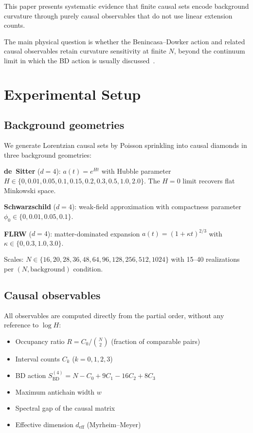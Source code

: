 \documentclass[12pt,a4paper]{article}
\newcommand{\SBD}{S_{\mathrm{BD}}}
\begin{document}
This paper presents systematic evidence that finite causal sets encode
background curvature through purely causal observables that do not use linear
extension counts.

The main physical question is whether the Benincasa--Dowker action and related
causal observables retain curvature sensitivity at finite $N$, beyond the
continuum limit in which the BD action is usually discussed~\cite{BenincasaDowker2010,Surya2019}.

\section{Experimental Setup}

\subsection{Background geometries}

We generate Lorentzian causal sets by Poisson sprinkling into causal diamonds
in three background geometries:

\textbf{de~Sitter} ($d=4$): $a(t) = e^{Ht}$ with Hubble parameter
$H\in\{0, 0.01, 0.05, 0.1, 0.15, 0.2, 0.3, 0.5, 1.0, 2.0\}$.
The $H=0$ limit recovers flat Minkowski space.

\textbf{Schwarzschild} ($d=4$): weak-field approximation with compactness
parameter $\phi_0\in\{0, 0.01, 0.05, 0.1\}$.

\textbf{FLRW} ($d=4$): matter-dominated expansion $a(t)=(1+\kappa t)^{2/3}$
with $\kappa\in\{0, 0.3, 1.0, 3.0\}$.

Scales: $N\in\{16, 20, 28, 36, 48, 64, 96, 128, 256, 512, 1024\}$ with
15--40 realizations per $(N, \text{background})$ condition.

\subsection{Causal observables}

All observables are computed directly from the partial order, without any
reference to $\log H$:
\begin{itemize}
\item Occupancy ratio $R = C_0/\binom{N}{2}$ (fraction of comparable pairs)
\item Interval counts $C_k$ ($k=0,1,2,3$)
\item BD action $\SBD^{(4)} = N - C_0 + 9C_1 - 16C_2 + 8C_3$
\item Maximum antichain width $w$
\item Spectral gap of the causal matrix
\item Effective dimension $d_{\mathrm{eff}}$ (Myrheim--Meyer)
\end{itemize}
\end{document}
